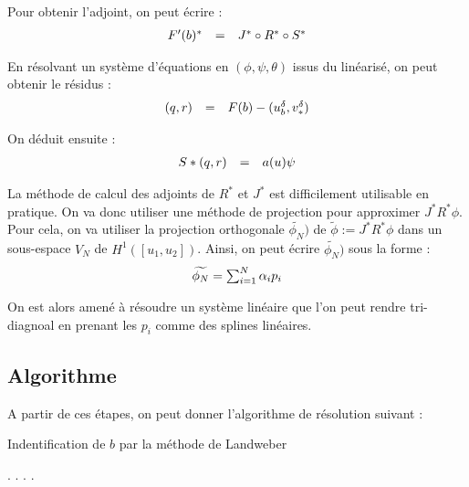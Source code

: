 \documentclass[a4paper,10pt]{article}
\begin{document}
Pour obtenir l'adjoint, on peut écrire :
\[
\begin{array}{l c r}
F'(b)^* &=& J^* \circ R^* \circ S^* \\
\end{array}
\]

En résolvant un système d'équations en $(\phi, \psi, \theta)$ issus du linéarisé, on peut obtenir le résidus :
\[
\begin{array}{l c r}
(q, r) &=& F(b) - (u_b^ \delta, v_*^ \delta) \\
\end{array}
\]

On déduit ensuite :
\[
\begin{array}{l c r}
S*(q, r) &=& a(u)\psi \\
\end{array}
\]

La méthode de calcul des adjoints de $R^*$ et $J^*$ est difficilement utilisable en pratique. On va donc utiliser une méthode de projection pour approximer $J^*R^*\phi$. Pour cela, on va utiliser la projection orthogonale $\widetilde{\phi_N})$ de $\widetilde{\phi}:=J^*R^*\phi$ dans un sous-espace $V_N$ de $H^1([u_1, u_2])$. Ainsi, on peut écrire $\widetilde{\phi_N})$ sous la forme :
\[
\begin{array}{l c r}
\widetilde{\phi_N} = \sum_{i=1}^{N} 
  \alpha_i p_i \\
\end{array}
\]

On est alors amené à résoudre un système linéaire que l'on peut rendre tri-diagnoal en prenant les $p_i$ comme des splines linéaires.


\subsection{Algorithme}

A partir de ces étapes, on peut donner l'algorithme de résolution suivant :
\begin{algorithm}
\caption{Indentification de $b$ par la méthode de Landweber}
\begin{algorithmic}
\STATE {}
	\STATE {}
	\STATE {}.
	\STATE {}.
	\STATE {}.
	\STATE {}.
	\STATE {}
\ENDWHILE
\end{algorithmic}
\end{algorithm}
\newpage
\end{document}

